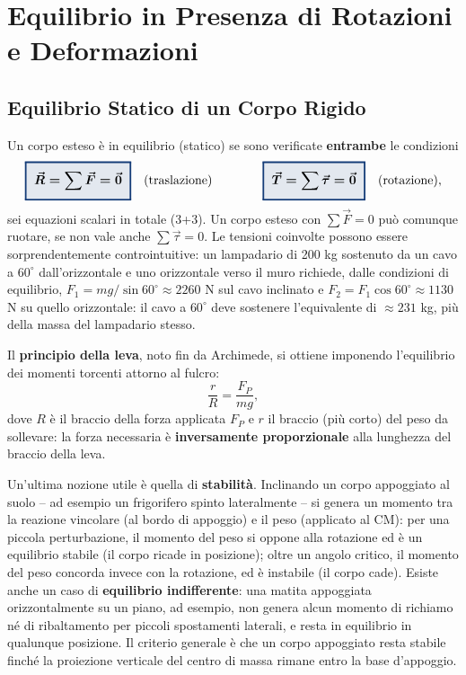 \documentclass[a4paper,11pt]{article}
\newcommand{\keyeq}[1]{{\setlength{\fboxsep}{6pt}\setlength{\fboxrule}{1.3pt}\fcolorbox{chapblue}{chapblue!12}{\boldmath$\displaystyle #1$}}}
\begin{document}
\newpage
\section{Equilibrio in Presenza di Rotazioni e Deformazioni}

\subsection{Equilibrio Statico di un Corpo Rigido}

Un corpo esteso è in equilibrio (statico) se sono verificate \textbf{entrambe} le condizioni
\[
\keyeq{\vec R = \sum\vec F = \vec 0} \quad \text{(traslazione)} \qquad\qquad \keyeq{\vec T = \sum\vec\tau = \vec 0} \quad \text{(rotazione)},
\]
sei equazioni scalari in totale (3+3). Un corpo esteso con $\sum\vec F=0$ può comunque ruotare, se non vale anche $\sum\vec\tau=0$. Le tensioni coinvolte possono essere sorprendentemente controintuitive: un lampadario di 200 kg sostenuto da un cavo a $60^{\circ}$ dall'orizzontale e uno orizzontale verso il muro richiede, dalle condizioni di equilibrio, $F_1=mg/\sin60^{\circ}\approx2260$ N sul cavo inclinato e $F_2=F_1\cos60^{\circ}\approx1130$ N su quello orizzontale: il cavo a $60^{\circ}$ deve sostenere l'equivalente di $\approx231$ kg, più della massa del lampadario stesso.

Il \textbf{principio della leva}, noto fin da Archimede, si ottiene imponendo l'equilibrio dei momenti torcenti attorno al fulcro:
\[
\frac{r}{R} = \frac{F_P}{mg},
\]
dove $R$ è il braccio della forza applicata $F_P$ e $r$ il braccio (più corto) del peso da sollevare: la forza necessaria è \textbf{inversamente proporzionale} alla lunghezza del braccio della leva.

Un'ultima nozione utile è quella di \textbf{stabilità}. Inclinando un corpo appoggiato al suolo -- ad esempio un frigorifero spinto lateralmente -- si genera un momento tra la reazione vincolare (al bordo di appoggio) e il peso (applicato al CM): per una piccola perturbazione, il momento del peso si oppone alla rotazione ed è un equilibrio stabile (il corpo ricade in posizione); oltre un angolo critico, il momento del peso concorda invece con la rotazione, ed è instabile (il corpo cade). Esiste anche un caso di \textbf{equilibrio indifferente}: una matita appoggiata orizzontalmente su un piano, ad esempio, non genera alcun momento di richiamo né di ribaltamento per piccoli spostamenti laterali, e resta in equilibrio in qualunque posizione. Il criterio generale è che un corpo appoggiato resta stabile finché la proiezione verticale del centro di massa rimane entro la base d'appoggio.
\end{document}
